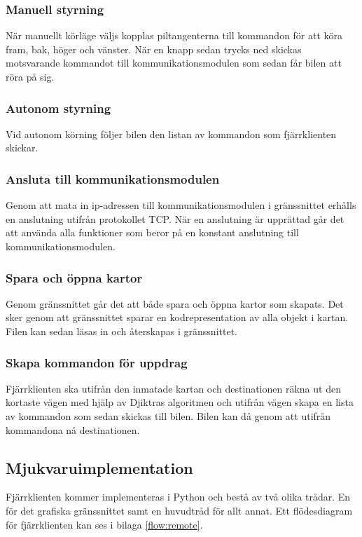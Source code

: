 \documentclass[tekniskrapport/tech.tex]{subfiles}
\begin{document}
\subsubsection{Manuell styrning}
När manuellt körläge väljs kopplas piltangenterna till kommandon för att köra
fram, bak, höger och vänster. När en knapp sedan trycks ned skickas motsvarande
kommandot till kommunikationsmodulen som sedan får bilen att röra på sig.

\subsubsection{Autonom styrning}
Vid autonom körning följer bilen den listan av kommandon som fjärrklienten
skickar.

\subsubsection{Ansluta till kommunikationsmodulen}
Genom att mata in ip-adressen till kommunikationsmodulen i gränssnittet erhålls
en anslutning utifrån protokollet TCP. När en anslutning är upprättad går det
att använda alla funktioner som beror på en konstant anslutning till
kommunikationsmodulen.

\subsubsection{Spara och öppna kartor}
Genom gränssnittet går det att både spara och öppna kartor som skapats. Det
sker genom att gränssnittet sparar en kodrepresentation av alla objekt i
kartan. Filen kan sedan läsas in och återskapas i gränssnittet.

\subsubsection{Skapa kommandon för uppdrag}
Fjärrklienten ska utifrån den inmatade kartan och destinationen räkna ut den
kortaste vägen med hjälp av Djiktras algoritmen och utifrån vägen skapa en
lista av kommandon som sedan skickas till bilen. Bilen kan då genom att utifrån
kommandona nå destinationen.

\subsection{Mjukvaruimplementation}
Fjärrklienten kommer implementeras i Python och bestå av två olika trådar. En
för det grafiska gränssnittet samt en huvudtråd för allt annat. Ett
flödesdiagram för fjärrklienten kan ses i bilaga \ref{flow:remote}.
\end{document}
